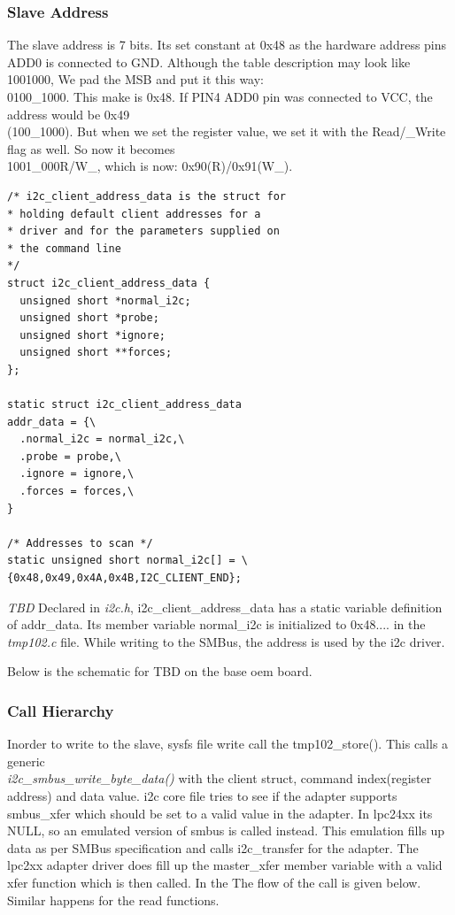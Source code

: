 \documentclass{article}
\begin{document}
\subsubsection{Slave Address}
The slave address is 7 bits. Its set constant at 0x48 as the hardware address pins ADD0 is connected to GND. Although the table description may look like \\
1001000, We pad the MSB and put it this way: \\0100\_1000. This make is 0x48. If PIN4 ADD0 pin was connected to VCC, the address would be 0x49\\
(100\_1000). But when we set the register value, we set it with the Read/\_Write flag as well. So now it becomes \\
1001\_000R/W\_, which is now: 0x90(R)/0x91(W\_).
\begin{verbatim}
/* i2c_client_address_data is the struct for 
* holding default client addresses for a 
* driver and for the parameters supplied on 
* the command line  
*/ 
struct i2c_client_address_data { 	
  unsigned short *normal_i2c; 	
  unsigned short *probe; 	
  unsigned short *ignore; 	
  unsigned short **forces; 
}; 

static struct i2c_client_address_data 
addr_data = {\ 
  .normal_i2c = normal_i2c,\
  .probe = probe,\ 
  .ignore = ignore,\
  .forces = forces,\ 
}

/* Addresses to scan */ 
static unsigned short normal_i2c[] = \
{0x48,0x49,0x4A,0x4B,I2C_CLIENT_END}; 
\end{verbatim}
\emph{TBD}
Declared in \emph{i2c.h}, i2c\_client\_address\_data has a static variable definition of addr\_data. Its member variable normal\_i2c is initialized to 0x48.... in the \emph{tmp102.c} file. While writing to the SMBus, the address is used by the i2c driver.

Below is the schematic for TBD on the base oem board. 


\subsubsection{Call Hierarchy}
Inorder to write to the slave, sysfs file write call the tmp102\_store(). This calls a generic \\ \emph{i2c\_smbus\_write\_byte\_data()} with the client struct, command index(register address) and data value. i2c core file tries to see if the adapter supports smbus\_xfer which should be set to a valid value in the adapter. In lpc24xx its NULL, so an emulated version of smbus is called instead. This emulation fills up data as per SMBus specification and calls i2c\_transfer for the adapter. The lpc2xx adapter driver does fill up the master\_xfer member variable with a valid xfer function which is then called. In the The flow of the call is given below. Similar happens for the read functions.
\end{document}
